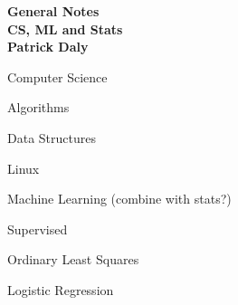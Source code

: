 \documentclass[11pt]{article}
\begin{document}
\begin{center}
  \vspace*{10mm}
  {\bf {\huge General Notes}}\\
  \vspace*{5mm}
  {\bf {CS, ML and Stats}
    \\ \vspace*{2mm} {\large Patrick Daly}
  }
\end{center}

\newpage

\begin{enumerate}

    \begin{item}

      Computer Science

      \begin{enumerate}

          \begin{item}
            Algorithms
          \end{item}

          \begin{item}
            Data Structures
          \end{item}

          \begin{item}
            Linux
          \end{item}

      \end{enumerate}

    \end{item}

    \begin{item}

      Machine Learning (combine with stats?)

      \begin{enumerate}

          \begin{item}

            Supervised

            \begin{enumerate}

                \begin{item}
                  Ordinary Least Squares
                \end{item}

                \begin{item}
                  Logistic Regression
                \end{item}


\end{enumerate}
\end{item}
\end{enumerate}
\end{item}
\end{enumerate}
\end{document}
